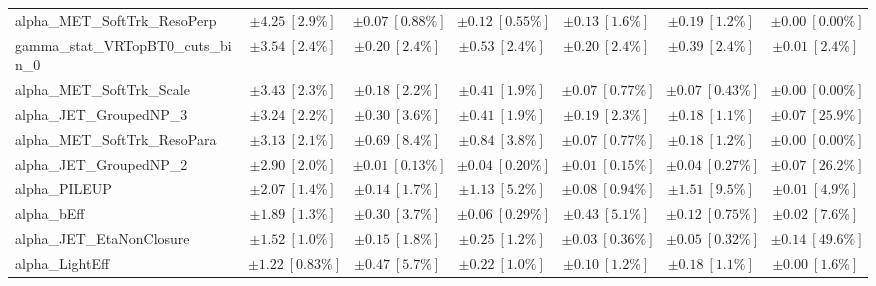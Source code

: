 \begin{sidewaystable}
\begin{center}
\begin{tabular*}{\textwidth}{@{\extracolsep{\fill}}lcccccc}
alpha\_MET\_SoftTrk\_ResoPerp         & $\pm 4.25\ [2.9\%] $          & $\pm 0.07\ [0.88\%] $          & $\pm 0.12\ [0.55\%] $          & $\pm 0.13\ [1.6\%] $          & $\pm 0.19\ [1.2\%] $          & $\pm 0.00\ [0.00\%] $       \\
gamma\_stat\_VRTopBT0\_cuts\_bin\_0         & $\pm 3.54\ [2.4\%] $          & $\pm 0.20\ [2.4\%] $          & $\pm 0.53\ [2.4\%] $          & $\pm 0.20\ [2.4\%] $          & $\pm 0.39\ [2.4\%] $          & $\pm 0.01\ [2.4\%] $       \\
alpha\_MET\_SoftTrk\_Scale         & $\pm 3.43\ [2.3\%] $          & $\pm 0.18\ [2.2\%] $          & $\pm 0.41\ [1.9\%] $          & $\pm 0.07\ [0.77\%] $          & $\pm 0.07\ [0.43\%] $          & $\pm 0.00\ [0.00\%] $       \\
alpha\_JET\_GroupedNP\_3         & $\pm 3.24\ [2.2\%] $          & $\pm 0.30\ [3.6\%] $          & $\pm 0.41\ [1.9\%] $          & $\pm 0.19\ [2.3\%] $          & $\pm 0.18\ [1.1\%] $          & $\pm 0.07\ [25.9\%] $       \\
alpha\_MET\_SoftTrk\_ResoPara         & $\pm 3.13\ [2.1\%] $          & $\pm 0.69\ [8.4\%] $          & $\pm 0.84\ [3.8\%] $          & $\pm 0.07\ [0.77\%] $          & $\pm 0.18\ [1.2\%] $          & $\pm 0.00\ [0.00\%] $       \\
alpha\_JET\_GroupedNP\_2         & $\pm 2.90\ [2.0\%] $          & $\pm 0.01\ [0.13\%] $          & $\pm 0.04\ [0.20\%] $          & $\pm 0.01\ [0.15\%] $          & $\pm 0.04\ [0.27\%] $          & $\pm 0.07\ [26.2\%] $       \\
alpha\_PILEUP         & $\pm 2.07\ [1.4\%] $          & $\pm 0.14\ [1.7\%] $          & $\pm 1.13\ [5.2\%] $          & $\pm 0.08\ [0.94\%] $          & $\pm 1.51\ [9.5\%] $          & $\pm 0.01\ [4.9\%] $       \\
alpha\_bEff         & $\pm 1.89\ [1.3\%] $          & $\pm 0.30\ [3.7\%] $          & $\pm 0.06\ [0.29\%] $          & $\pm 0.43\ [5.1\%] $          & $\pm 0.12\ [0.75\%] $          & $\pm 0.02\ [7.6\%] $       \\
alpha\_JET\_EtaNonClosure         & $\pm 1.52\ [1.0\%] $          & $\pm 0.15\ [1.8\%] $          & $\pm 0.25\ [1.2\%] $          & $\pm 0.03\ [0.36\%] $          & $\pm 0.05\ [0.32\%] $          & $\pm 0.14\ [49.6\%] $       \\
alpha\_LightEff         & $\pm 1.22\ [0.83\%] $          & $\pm 0.47\ [5.7\%] $          & $\pm 0.22\ [1.0\%] $          & $\pm 0.10\ [1.2\%] $          & $\pm 0.18\ [1.1\%] $          & $\pm 0.00\ [1.6\%] $       \\

\end{tabular*}
\end{center}
\end{sidewaystable}
